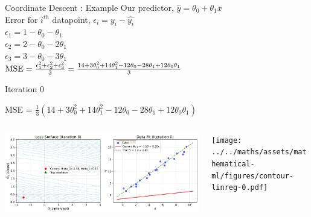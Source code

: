 \documentclass{beamer}
\begin{document}
\begin{frame}{Coordinate Descent : Example}
Our predictor, $\hat{y} = \theta_0 + \theta_1x$\\
\vspace{1cm}
Error for $i^{th}$ datapoint, $\epsilon_i = y_i - \hat{y_i}$\\
$\epsilon_1 = 1 - \theta_0 - \theta_1$ \\
$\epsilon_2 = 2 - \theta_0 - 2\theta_1$ \\
$\epsilon_3 = 3 - \theta_0 - 3\theta_1$ \\

\vspace{1cm}
$\operatorname{MSE} = \frac{\epsilon_1^2 + \epsilon_2^2 + \epsilon_3^2}{3} = \frac{14 + 3\theta_0^2 + 14\theta_1^2 -12\theta_0 - 28\theta_1 + 12\theta_0\theta_1}{3}$\\
\end{frame}





\begin{frame}{Iteration 0}

MSE = $\frac{1}{3}(14+3\theta_{0}^{2}+14\theta_{1}^{2}-12\theta_{0}-28\theta_{1}+12\theta_{0}\theta_{1})$\\

\begin{columns}
\begin{column}{0.6\textwidth}
\begin{adjustbox}{max totalsize={\textwidth},center}
\includegraphics[width=\textwidth]{../../maths/assets/mathematical-ml/figures/gradient-descent-0.pdf}
\end{adjustbox}

\end{column}
\begin{column}{0.5\textwidth}
\begin{adjustbox}{max totalsize={\textwidth},center}
\texttt{[image: ../../maths/assets/mathematical-ml/figures/contour-linreg-0.pdf]}
\end{adjustbox}
\end{column}
\end{columns}




\end{frame}
\end{document}

